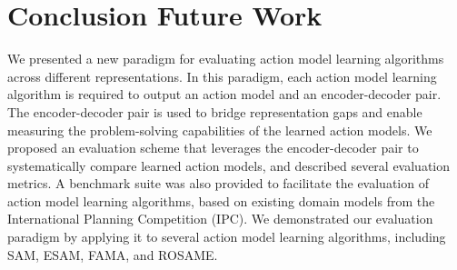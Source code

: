 \documentclass{article}
\theoremstyle{definition}
\theoremstyle{remark}
\begin{document}
\section{Conclusion Future Work}
We presented a new paradigm for evaluating action 
model learning algorithms across different representations. In this paradigm, each action model learning algorithm is required to output an action model and an encoder-decoder pair. The encoder-decoder pair is used to bridge representation gaps and enable measuring the problem-solving capabilities of the learned action models. We proposed an evaluation scheme that leverages the encoder-decoder pair to systematically compare learned action models, and described several evaluation metrics. A benchmark suite was also provided to facilitate the evaluation of action model learning algorithms, based on existing domain models from the International Planning Competition (IPC). We demonstrated our evaluation paradigm by applying it to several action model learning algorithms, including SAM, ESAM, FAMA, and ROSAME.




 
\end{document}
